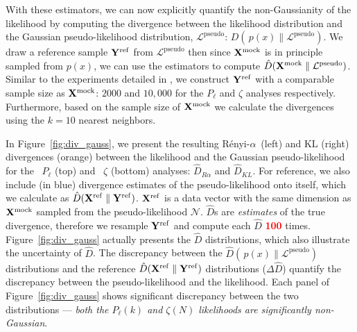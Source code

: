 \documentclass[12pt, letterpaper, preprint]{aastex}
\newcommand{\todo}[1]{{\bf \textcolor{red}{#1}}}
\newcommand{\Xmock}{{\bf X}^\mathrm{mock}}
\newcommand{\Xref}{{\bf X}^\mathrm{ref}}
\newcommand{\Yref}{{\bf Y}^\mathrm{ref}}
\newcommand{\Ralpha}{R\'enyi-$\alpha$}
\newcommand{\Beut}{\citetalias{beutler2017}}
\newcommand{\Sinh}{\citetalias{sinha2017a}}
\begin{document}
With these estimators, we can now explicitly quantify the 
non-Gaussianity of the likelihood by computing the divergence 
between the likelihood distribution and the Gaussian 
pseudo-likelihood distribution, $\mathcal{L}^\mathrm{pseudo}$:
$D(\, p(x) \parallel \mathcal{L}^\mathrm{pseudo})$.%
We draw a reference sample ${\bf Y}^\mathrm{ref}$ from 
$\mathcal{L}^\mathrm{pseudo}$ then %
since $\Xmock$ is in principle sampled from $p(x)$, we can use the 
estimators to compute $\hat{D}(\Xmock \parallel \mathcal{L}^\mathrm{pseudo})$.
Similar to the experiments detailed in \cite{poczos2012}, 
we construct ${\bf Y}^\mathrm{ref}$ with a comparable sample size as $\Xmock$: 
$2000$ and $10,000$ for the $P_\ell$ and $\zeta$ analyses respectively. 
Furthermore, based on the sample size of $\Xmock$ we calculate the 
divergences using the $k=10$ nearest neighbors. 

In Figure~\ref{fig:div_gauss}, we present the resulting \Ralpha~(left) 
and KL (right) divergences (orange) between the likelihood and the 
Gaussian pseudo-likelihood for the \Beut~$P_\ell$ (top) and \Sinh~$\zeta$ (bottom) 
analyses: $\hat{D}_{R\alpha}$ and $\hat{D}_{KL}$. For reference, we also 
include (in blue) divergence estimates of the pseudo-likelihood onto itself, 
which we calculate as $\hat{D}(\Xref \parallel \Yref)$. $\Xref$ is a 
data vector with the same dimension as $\Xmock$ sampled from the pseudo-likelihood 
$\mathcal{N}$. $\hat{D}$s are \emph{estimates} of the true divergence, 
therefore we resample $\Yref$ and compute each $\hat{D}$ \todo{100} times. 
Figure~\ref{fig:div_gauss} actually presents the $\hat{D}$ distributions, 
which also illustrate the uncertainty of $\hat{D}$. The discrepancy between 
the $\hat{D}(\, p(x) \parallel \mathcal{L}^\mathrm{pseudo})$
distributions and the reference $\hat{D}(\Xref \parallel \Yref)$ distributions 
($\Delta \hat{D}$) quantify the discrepancy between the pseudo-likelihood
and the likelihood. Each panel of Figure~\ref{fig:div_gauss} shows significant 
discrepancy between the two distributions --- \emph{both 
the $P_\ell(k)$ and $\zeta(N)$ likelihoods are significantly non-Gaussian}. 
\end{document}
